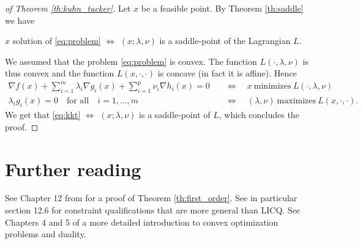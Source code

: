 \documentclass[11pt,nocut]{article}
\begin{document}
\begin{proof}[of Theorem \ref{th:kuhn_tucker}]
	Let $x$ be a feasible point.
	By Theorem \ref{th:saddle} we have
	\begin{center}
		$x$ solution of \eqref{eq:problem} $\Longleftrightarrow$ $(x; \lambda, \nu)$ is a saddle-point of the Lagrangian $L$.
	\end{center}
	
	We assumed that the problem \eqref{eq:problem} is convex. 
	The function $L(\cdot, \lambda,\nu)$ is thus convex and the function $L(x,\cdot,\cdot)$ is concave (in fact it is affine). Hence
	\begin{align*}
			\nabla f(x) + \sum_{i=1}^m \lambda_i \nabla g_i(x) + \sum_{i=1}^p \nu_i \nabla h_i(x) = 0
			\quad &\Longleftrightarrow \quad
			x \ \text{minimizes} \ L(\cdot,\lambda,\nu)
			\\
		\lambda_i g_i(x) = 0 \quad \text{for all} \quad i=1, \dots, m
		\quad &\Longleftrightarrow \quad
			(\lambda,\nu) \ \text{maximizes} \ L(x,\cdot,\cdot).
	\end{align*}
	We get that \eqref{eq:kkt} $\Longleftrightarrow$ $(x;\lambda,\nu)$ is a saddle-point of $L$, which concludes the proof.
\end{proof}

\section*{Further reading}

See Chapter 12 from \cite{nocedal2006numerical} for a proof of Theorem \ref{th:first_order}. See in particular section 12.6 for constraint qualifications that are more general than LICQ.
See Chapters 4 and 5 of \cite{boyd2004convex} a more detailed introduction to convex optimization problems and duality.

\vspace{1cm}
\centerline{}




\end{document}
